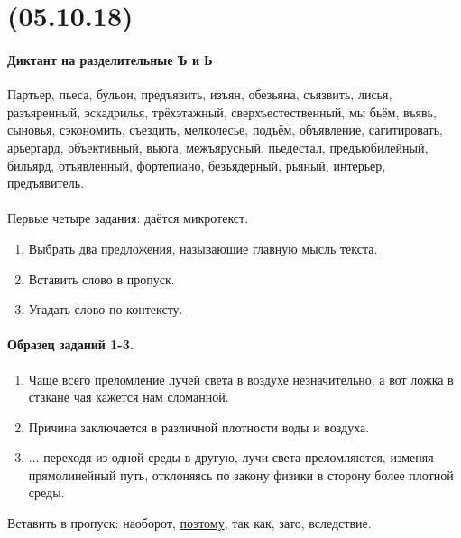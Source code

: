 \documentclass{article}
\begin{document}
\noindent\makebox[\linewidth]{\rule{\paperwidth}{0.4pt}}
\section{(05.10.18)}
\noindent\makebox[\linewidth]{\rule{\paperwidth}{0.4pt}}

\paragraph{Диктант на разделительные Ъ и Ь} Партьер, пьеса, бульон, предъявить, изъян, обезьяна, съязвить,
лисья, разъяренный, эскадрилья, трёхэтажный, сверхъестественный, мы бьём, въявь, сыновья, сэкономить,
съездить, мелколесье, подъём, объявление, сагитировать, арьергард, объективный, вьюга, межъярусный,
пьедестал, предъюбилейный, бильярд, отъявленный, фортепиано, безъядерный, рьяный, интерьер, предъявитель.

\paragraph{}

Первые четыре задания: даётся микротекст.
\begin{enumerate}
\item
  Выбрать два предложения, называющие главную мысль текста.
\item
  Вставить слово в пропуск.
\item
  Угадать слово по контексту.
\end{enumerate}

\paragraph{Образец заданий 1-3.}
\begin{enumerate}
\item
Чаще всего преломление лучей света в воздухе незначительно, а вот ложка в стакане чая кажется нам сломанной.
\item
  Причина заключается в различной плотности воды и воздуха.
\item
  ... переходя из одной среды в другую, лучи света преломляются, изменяя прямолинейный путь, отклоняясь по закону
физики в сторону более плотной среды.
\end{enumerate}

Вставить в пропуск: наоборот, \underline{поэтому}, так как, зато, вследствие.\\

\paragraph{}
\end{document}
